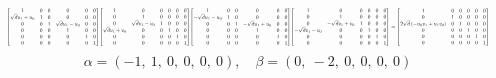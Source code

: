 \documentclass[11pt]{article}
\theoremstyle{definition}
\begin{document}
\[
\scaletoalign{\textwidth}{{\left[\begin{matrix}1 & 0 & 0 & 0 & 0 & 0\\\sqrt{d} u_{1} + u_{0} & 1 & 0 & 0 & 0 & 0\\0 & 0 & 1 & \sqrt{d} u_{1} - u_{0} & 0 & 0\\0 & 0 & 0 & 1 & 0 & 0\\0 & 0 & 0 & 0 & 1 & 0\\0 & 0 & 0 & 0 & 0 & 1\end{matrix}\right]} {\left[\begin{matrix}1 & 0 & 0 & 0 & 0 & 0\\0 & 1 & 0 & 0 & 0 & 0\\0 & \sqrt{d} v_{1} - v_{0} & 1 & 0 & 0 & 0\\\sqrt{d} v_{1} + v_{0} & 0 & 0 & 1 & 0 & 0\\0 & 0 & 0 & 0 & 1 & 0\\0 & 0 & 0 & 0 & 0 & 1\end{matrix}\right]} {\left[\begin{matrix}1 & 0 & 0 & 0 & 0 & 0\\- \sqrt{d} u_{1} - u_{0} & 1 & 0 & 0 & 0 & 0\\0 & 0 & 1 & - \sqrt{d} u_{1} + u_{0} & 0 & 0\\0 & 0 & 0 & 1 & 0 & 0\\0 & 0 & 0 & 0 & 1 & 0\\0 & 0 & 0 & 0 & 0 & 1\end{matrix}\right]} {\left[\begin{matrix}1 & 0 & 0 & 0 & 0 & 0\\0 & 1 & 0 & 0 & 0 & 0\\0 & - \sqrt{d} v_{1} + v_{0} & 1 & 0 & 0 & 0\\- \sqrt{d} v_{1} - v_{0} & 0 & 0 & 1 & 0 & 0\\0 & 0 & 0 & 0 & 1 & 0\\0 & 0 & 0 & 0 & 0 & 1\end{matrix}\right]} = {\left[\begin{matrix}1 & 0 & 0 & 0 & 0 & 0\\0 & 1 & 0 & 0 & 0 & 0\\2 \sqrt{d} \left(- u_{0} v_{1} + u_{1} v_{0}\right) & 0 & 1 & 0 & 0 & 0\\0 & 0 & 0 & 1 & 0 & 0\\0 & 0 & 0 & 0 & 1 & 0\\0 & 0 & 0 & 0 & 0 & 1\end{matrix}\right]}}
\]
\[
\alpha = \left( -1, \  1, \  0, \  0, \  0, \  0\right), \quad \beta = \left( 0, \  -2, \  0, \  0, \  0, \  0\right)
\]
\end{document}
